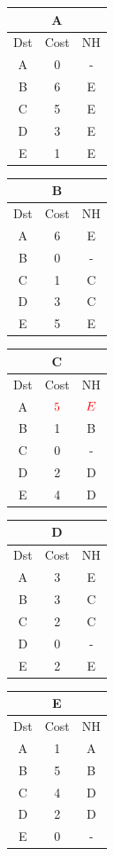 \documentclass[10pt]{article}
\begin{document}
			\begin{table}[h!]
				\begin{tabular}{|c||c||c|}
					\hline
					\multicolumn{3}{|c|}{A} \\
					\hline
					Dst & Cost & NH \\
					\hline
					A & 0 & - \\
					B & 6 & E \\
					C & 5 & E \\
					D & 3 & E \\
					E & 1 & E \\
					\hline
				\end{tabular}
				\begin{tabular}{|c||c||c|}
					\hline
					\multicolumn{3}{|c|}{B} \\
					\hline
					Dst & Cost & NH\\
					\hline
					A & 6 & E \\
					B & 0 & - \\
					C & 1 & C \\
					D & 3 & C \\
					E & 5 & E \\
					\hline
				\end{tabular}
				\begin{tabular}{|c||c||c|}
					\hline
					\multicolumn{3}{|c|}{C} \\
					\hline
					Dst & Cost & NH \\
					\hline
					A & $\color{red} 5$ & $\color{red} E$ \\
					B & 1 & B \\
					C & 0 & - \\
					D & 2 & D \\
					E & 4 & D \\
					\hline
				\end{tabular}
				\begin{tabular}{|c||c||c|}
					\hline
					\multicolumn{3}{|c|}{D} \\
					\hline
					Dst & Cost & NH \\
					\hline
					A & 3 & E \\
					B & 3 & C \\
					C & 2 & C \\
					D & 0 & - \\
					E & 2 & E \\
					\hline
				\end{tabular}
				\begin{tabular}{|c||c||c|}
					\hline
					\multicolumn{3}{|c|}{E} \\
					\hline
					Dst & Cost & NH \\
					\hline
					A & 1 & A \\
					B & 5 & B \\
					C & 4 & D \\
					D & 2 & D \\
					E & 0 & - \\
					\hline
				\end{tabular}
			\end{table}
		
\end{document}
